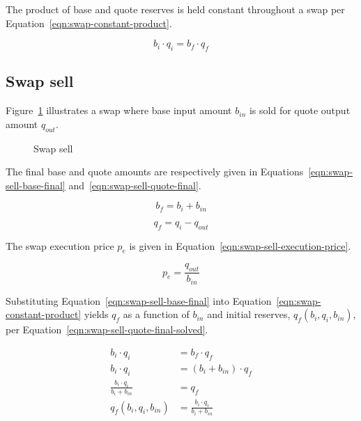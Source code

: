 \documentclass[table, twocolumn]{article}
\begin{document}
The product of base and quote reserves is held constant throughout a swap per
Equation~\ref{eqn:swap-constant-product}.

\begin{equation}\label{eqn:swap-constant-product}
	b_i \cdot q_i = b_f \cdot q_f
\end{equation}

\subsection{Swap sell}\label{ssec:swap-sell}

Figure~\ref{fig:swap-sell} illustrates a swap where base input amount $b_{in}$ is sold
for quote output amount $q_{out}$.

\begin{figure}[!htb]
	\centering
	
	\caption{Swap sell}\label{fig:swap-sell}
\end{figure}

The final base and quote amounts are respectively given in
Equations~\ref{eqn:swap-sell-base-final} and~\ref{eqn:swap-sell-quote-final}.

\begin{equation}\label{eqn:swap-sell-base-final}
	b_f = b_i + b_{in}
\end{equation}

\begin{equation}\label{eqn:swap-sell-quote-final}
	q_f = q_i - q_{out}
\end{equation}

The swap execution price $p_e$ is given in Equation~\ref{eqn:swap-sell-execution-price}.

\begin{equation}\label{eqn:swap-sell-execution-price}
	p_e = \frac{q_{out}}{b_{in}}
\end{equation}

Substituting Equation~\ref{eqn:swap-sell-base-final} into
Equation~\ref{eqn:swap-constant-product} yields $q_f$ as a function of $b_{in}$ and
initial reserves, $q_f(b_i, q_i, b_{in})$, per
Equation~\ref{eqn:swap-sell-quote-final-solved}.

\begin{align}\label{eqn:swap-sell-quote-final-solved}
	b_i \cdot q_i                      & = b_f \cdot q_f \nonumber            \\
	b_i \cdot q_i                      & = (b_i + b_{in}) \cdot q_f \nonumber \\
	\frac{b_i \cdot q_i}{b_i + b_{in}} & = q_f \nonumber                      \\
	q_f(b_i, q_i, b_{in})              & = \frac{b_i \cdot q_i}{b_i + b_{in}}
\end{align}
\end{document}
